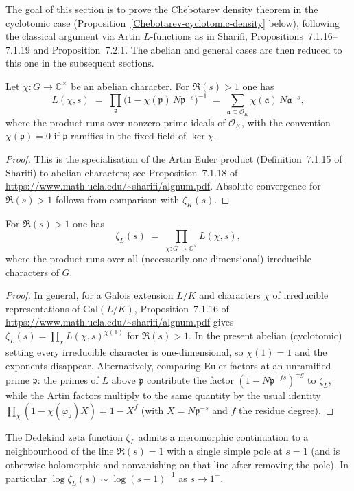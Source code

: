 The goal of this section is to prove the Chebotarev density theorem in the cyclotomic case
(Proposition~\ref{Chebotarev-cyclotomic-density} below), following the classical argument via
Artin $L$-functions as in Sharifi, Propositions~7.1.16--7.1.19 and Proposition~7.2.1.  The
abelian and general cases are then reduced to this one in the subsequent sections.
\begin{lemma}\label{Artin-L-euler}
Let $\chi : G \to \mathbb{C}^\times$ be an abelian character.  For $\Re(s) > 1$ one has
\[
L(\chi,s) \;=\; \prod_{\mathfrak{p}} \bigl(1 - \chi(\mathfrak{p})\, N\mathfrak{p}^{-s}\bigr)^{-1}
\;=\; \sum_{\mathfrak{a} \subseteq \mathcal{O}_K} \chi(\mathfrak{a})\, N\mathfrak{a}^{-s},
\]
where the product runs over nonzero prime ideals of $\mathcal{O}_K$, with the convention
$\chi(\mathfrak{p}) = 0$ if $\mathfrak{p}$ ramifies in the fixed field of $\ker\chi$.
\end{lemma}
\begin{proof}
This is the specialisation of the Artin Euler product (Definition~7.1.15 of Sharifi) to
abelian characters; see Proposition~7.1.18 of
\url{https://www.math.ucla.edu/~sharifi/algnum.pdf}.  Absolute convergence for $\Re(s)>1$
follows from comparison with $\zeta_K(s)$.
\end{proof}
\begin{lemma}\label{Dedekind-factor}
For $\Re(s) > 1$ one has
\[
\zeta_L(s) \;=\; \prod_{\chi : G \to \mathbb{C}^\times} L(\chi,s),
\]
where the product runs over all (necessarily one-dimensional) irreducible characters of $G$.
\end{lemma}
\begin{proof}
In general, for a Galois extension $L/K$ and characters $\chi$ of irreducible representations of
$\mathrm{Gal}(L/K)$, Proposition~7.1.16 of
\url{https://www.math.ucla.edu/~sharifi/algnum.pdf} gives
$\zeta_L(s) = \prod_\chi L(\chi,s)^{\chi(1)}$ for $\Re(s)>1$.  In the present abelian
(cyclotomic) setting every irreducible character is one-dimensional, so $\chi(1)=1$ and the
exponents disappear.  Alternatively, comparing Euler factors at an unramified prime
$\mathfrak{p}$: the primes of $L$ above $\mathfrak{p}$ contribute the factor
$(1 - N\mathfrak{p}^{-fs})^{-g}$ to $\zeta_L$, while the Artin factors multiply to the same
quantity by the usual identity $\prod_\chi (1 - \chi(\varphi_{\mathfrak{p}}) X) = 1 - X^f$
(with $X = N\mathfrak{p}^{-s}$ and $f$ the residue degree).
\end{proof}
\begin{lemma}\label{Dedekind-pole}
The Dedekind zeta function $\zeta_L$ admits a meromorphic continuation to a neighbourhood of
the line $\Re(s)=1$ with a single simple pole at $s=1$ (and is otherwise holomorphic and
nonvanishing on that line after removing the pole).  In particular
$\log \zeta_L(s) \sim \log(s-1)^{-1}$ as $s \to 1^+$.
\end{lemma}
